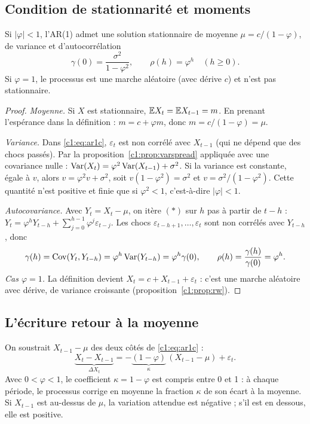 \subsection{Condition de stationnarité et moments}

\begin{proposition}\label{c1:prop:ar1}
Si $|\varphi| < 1$, l'AR(1) admet une solution stationnaire de moyenne $\mu = c/(1-\varphi)$, de variance et d'autocorrélation
\[
\gamma(0) = \frac{\sigma^2}{1-\varphi^2}, \qquad \rho(h) = \varphi^{h}\quad (h\ge0).
\]
Si $\varphi = 1$, le processus est une marche aléatoire (avec dérive $c$) et n'est pas stationnaire.
\end{proposition}
\begin{proof}
\emph{Moyenne.} Si $X$ est stationnaire, $\mathbb{E} X_t = \mathbb{E} X_{t-1} = m$. En prenant l'espérance dans la définition : $m = c + \varphi m$, donc $m = c/(1-\varphi) = \mu$.

\emph{Variance.} Dans \eqref{c1:eq:ar1c}, $\varepsilon_t$ est non corrélé avec $X_{t-1}$ (qui ne dépend que des chocs passés). Par la proposition~\ref{c1:prop:varspread} appliquée avec une covariance nulle : $\operatorname{Var}(X_t) = \varphi^2\operatorname{Var}(X_{t-1}) + \sigma^2$. Si la variance est constante, égale à $v$, alors $v = \varphi^2 v + \sigma^2$, soit $v(1-\varphi^2) = \sigma^2$ et $v = \sigma^2/(1-\varphi^2)$. Cette quantité n'est positive et finie que si $\varphi^2<1$, c'est-à-dire $|\varphi|<1$.

\emph{Autocovariance.} Avec $Y_t = X_t-\mu$, on itère $(\ast)$ sur $h$ pas à partir de $t-h$ : $Y_t = \varphi^h Y_{t-h} + \sum_{j=0}^{h-1}\varphi^j\varepsilon_{t-j}$. Les chocs $\varepsilon_{t-h+1},\dots,\varepsilon_t$ sont non corrélés avec $Y_{t-h}$, donc
\[
\gamma(h) = \operatorname{Cov}(Y_t, Y_{t-h}) = \varphi^h\operatorname{Var}(Y_{t-h}) = \varphi^h\gamma(0), \qquad \rho(h) = \frac{\gamma(h)}{\gamma(0)} = \varphi^h.
\]
\emph{Cas $\varphi=1$.} La définition devient $X_t = c + X_{t-1} + \varepsilon_t$ : c'est une marche aléatoire avec dérive, de variance croissante (proposition~\ref{c1:prop:rw}).
\end{proof}

\subsection{L'écriture \og retour à la moyenne\fg}

On soustrait $X_{t-1}-\mu$ des deux côtés de \eqref{c1:eq:ar1c} :
\begin{equation}\label{c1:eq:ecm}
\underbrace{X_t - X_{t-1}}_{\Delta X_t} = -\underbrace{(1-\varphi)}_{\kappa}\,(X_{t-1}-\mu) + \varepsilon_t.
\end{equation}
Avec $0<\varphi<1$, le coefficient $\kappa = 1-\varphi$ est compris entre 0 et 1 : à chaque période, le processus corrige en moyenne la fraction $\kappa$ de son écart à la moyenne. Si $X_{t-1}$ est au-dessus de $\mu$, la variation attendue est négative ; s'il est en dessous, elle est positive.

